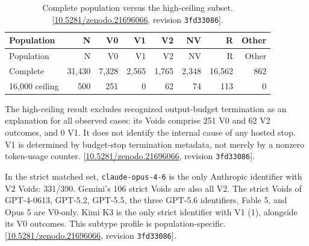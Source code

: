 \documentclass[11pt,letterpaper]{article}
\begin{document}
\begin{longtable}{lrrrrrrr}
\caption{Complete population versus the high-ceiling subset. [\href{https://doi.org/10.5281/zenodo.21696066}{10.5281/zenodo.21696066}, revision \texttt{3fd33086}].}\label{tab:evidence-10}\\
\toprule
Population & N & V0 & V1 & V2 & NV & R & Other \\ \midrule
\endfirsthead
\toprule
Population & N & V0 & V1 & V2 & NV & R & Other \\ \midrule
\endhead
Complete & 31,430 & 7,328 & 2,565 & 1,765 & 2,348 & 16,562 & 862 \\
16,000 ceiling & 500 & 251 & 0 & 62 & 74 & 113 & 0 \\
\bottomrule\end{longtable}

The high-ceiling result excludes recognized output-budget termination as an explanation for all observed cases: its Voids comprise 251 V0 and 62 V2 outcomes, and 0 V1. It does not identify the internal cause of any hosted stop. V1 is determined by budget-stop termination metadata, not merely by a nonzero token-usage counter. [\href{https://doi.org/10.5281/zenodo.21696066}{10.5281/zenodo.21696066}, revision \texttt{3fd33086}].

In the strict matched set, \texttt{claude-opus-4-6} is the only Anthropic identifier with V2 Voids: 331/390. Gemini’s 106 strict Voids are also all V2. The strict Voids of GPT-4-0613, GPT-5.2, GPT-5.5, the three GPT-5.6 identifiers, Fable 5, and Opus 5 are V0-only. Kimi K3 is the only strict identifier with V1 (1), alongside its V0 outcomes. This subtype profile is population-specific. [\href{https://doi.org/10.5281/zenodo.21696066}{10.5281/zenodo.21696066}, revision \texttt{3fd33086}].
\end{document}
